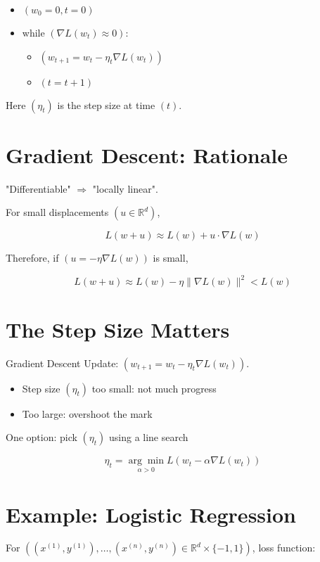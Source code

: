 \documentclass{article}
\begin{document}
\begin{itemize}
    \item $( w_{0} = 0, t = 0 )$
    \item while $( \nabla L(w_{t}) \approx 0 )$:
    \begin{itemize}
        \item $( w_{t+1} = w_{t} - \eta_{t} \nabla L(w_{t}) )$
        \item $( t = t + 1 )$
    \end{itemize}
\end{itemize}

Here $( \eta_{t} )$ is the step size at time $( t )$.

\section*{Gradient Descent: Rationale}
"Differentiable" $\Rightarrow$ "locally linear".

For small displacements $( u \in \mathbb{R}^{d} )$,

\begin{equation}
L(w + u) \approx L(w) + u \cdot \nabla L(w)
\end{equation}

Therefore, if $( u = -\eta \nabla L(w) )$ is small,

\begin{equation}
L(w + u) \approx L(w) - \eta \|\nabla L(w)\|^{2} < L(w)
\end{equation}

\section*{The Step Size Matters}
Gradient Descent Update: $( w_{t+1} = w_{t} - \eta_{t} \nabla L(w_{t}) )$.

\begin{itemize}
    \item Step size $( \eta_{t} )$ too small: not much progress
    \item Too large: overshoot the mark
\end{itemize}

One option: pick $( \eta_{t} )$ using a line search

\begin{equation}
\eta_{t} = \underset{\alpha > 0}{\arg \min } L\left(w_{t} - \alpha \nabla L(w_{t})\right)
\end{equation}

\section*{Example: Logistic Regression}
For $( \left(x^{(1)}, y^{(1)}\right), \ldots, \left(x^{(n)}, y^{(n)}\right) \in \mathbb{R}^{d} \times \{-1,1\} )$, loss function:
\end{document}

